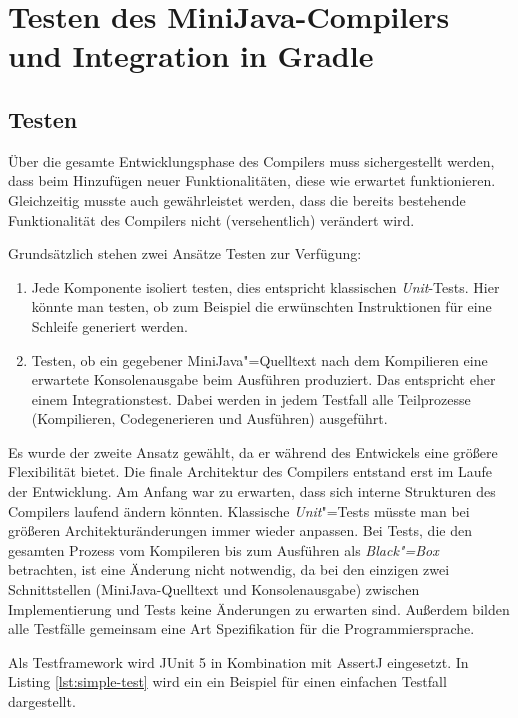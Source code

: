 \chapter{Testen des MiniJava-Compilers und Integration in Gradle}
\label{cha:Testen-des-Compilers}

\section{Testen}

Über die gesamte Entwicklungsphase des Compilers muss sichergestellt werden, dass beim Hinzufügen neuer Funktionalitäten, diese wie erwartet funktionieren. Gleichzeitig musste auch gewährleistet werden, dass die bereits bestehende Funktionalität des Compilers nicht (versehentlich) verändert wird.

Grundsätzlich stehen zwei Ansätze Testen zur Verfügung:
\begin{enumerate}
    \item Jede Komponente isoliert testen, dies entspricht klassischen \emph{Unit}-Tests. Hier könnte man testen, ob zum Beispiel die erwünschten Instruktionen für eine Schleife generiert werden. 
    \item Testen, ob ein gegebener MiniJava"=Quelltext nach dem Kompilieren eine erwartete Konsolenausgabe beim Ausführen produziert. Das entspricht eher einem Integrationstest. Dabei werden in jedem Testfall alle Teilprozesse (Kompilieren, Codegenerieren und Ausführen) ausgeführt.
\end{enumerate}

Es wurde der zweite Ansatz gewählt, da er während des Entwickels eine größere Flexibilität bietet. Die finale Architektur des Compilers entstand erst im Laufe der Entwicklung. Am Anfang war zu erwarten, dass sich interne Strukturen des Compilers laufend ändern könnten. Klassische \emph{Unit}"=Tests müsste man bei größeren Architekturänderungen immer wieder anpassen. Bei Tests, die den gesamten Prozess vom Kompileren bis zum Ausführen als \emph{Black"=Box} betrachten, ist eine Änderung nicht notwendig, da bei den einzigen zwei Schnittstellen (MiniJava-Quelltext und Konsolenausgabe) zwischen Implementierung und Tests keine Änderungen zu erwarten sind. Außerdem bilden alle Testfälle gemeinsam eine Art Spezifikation für die Programmiersprache.

Als Testframework wird JUnit 5 \cite{JUnit} in Kombination mit AssertJ \cite{AssertJ} eingesetzt. In Listing \ref{lst:simple-test} wird ein ein Beispiel für einen einfachen Testfall dargestellt.

